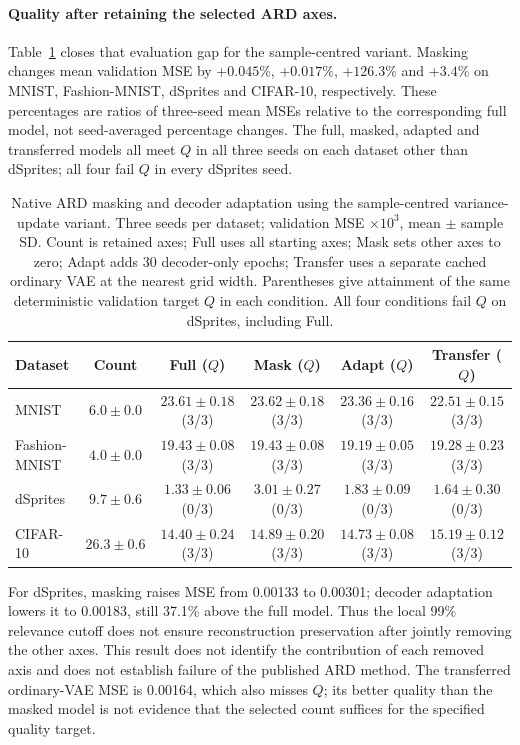 \documentclass[make,article,submit,pdftex,moreauthors]{Definitions/mdpi}
\begin{document}
\paragraph{Quality after retaining the selected ARD axes.}
Table~\ref{tab:ardpruned} closes that evaluation gap for the
sample-centred variant. Masking changes mean validation MSE by
$+0.045\%$, $+0.017\%$, $+126.3\%$ and $+3.4\%$ on MNIST,
Fashion-MNIST, dSprites and CIFAR-10, respectively. These percentages
are ratios of three-seed mean MSEs relative to the corresponding full
model, not seed-averaged percentage changes. The full, masked, adapted
and transferred models all meet $Q$ in all three seeds on each dataset
other than dSprites; all four fail $Q$ in every dSprites seed.
\begin{table}[H]
\caption{Native ARD masking and decoder adaptation using the sample-centred variance-update variant. Three seeds per dataset; validation MSE $\times10^3$, mean $\pm$ sample SD. Count is retained axes; Full uses all starting axes; Mask sets other axes to zero; Adapt adds 30 decoder-only epochs; Transfer uses a separate cached ordinary VAE at the nearest grid width. Parentheses give attainment of the same deterministic validation target $Q$ in each condition. All four conditions fail $Q$ on dSprites, including Full.}\label{tab:ardpruned}
\footnotesize
\setlength{\tabcolsep}{3pt}
\begin{tabular*}{\textwidth}{@{\extracolsep{\fill}}lccccc@{}}
\toprule
Dataset & Count & Full ($Q$) & Mask ($Q$) & Adapt ($Q$) & Transfer ($Q$) \\
\midrule
MNIST & $6.0 \pm 0.0$ & $23.61 \pm 0.18$ (3/3) & $23.62 \pm 0.18$ (3/3) & $23.36 \pm 0.16$ (3/3) & $22.51 \pm 0.15$ (3/3) \\
Fashion-MNIST & $4.0 \pm 0.0$ & $19.43 \pm 0.08$ (3/3) & $19.43 \pm 0.08$ (3/3) & $19.19 \pm 0.05$ (3/3) & $19.28 \pm 0.23$ (3/3) \\
dSprites & $9.7 \pm 0.6$ & $1.33 \pm 0.06$ (0/3) & $3.01 \pm 0.27$ (0/3) & $1.83 \pm 0.09$ (0/3) & $1.64 \pm 0.30$ (0/3) \\
CIFAR-10 & $26.3 \pm 0.6$ & $14.40 \pm 0.24$ (3/3) & $14.89 \pm 0.20$ (3/3) & $14.73 \pm 0.08$ (3/3) & $15.19 \pm 0.12$ (3/3) \\
\bottomrule\end{tabular*}
\end{table}


For dSprites, masking raises MSE from 0.00133 to 0.00301; decoder
adaptation lowers it to 0.00183, still 37.1\% above the full model.
Thus the local 99\% relevance cutoff does not ensure reconstruction
preservation after jointly removing the other axes. This result does
not identify the contribution of each removed axis and does not
establish failure of the published ARD method. The transferred
ordinary-VAE MSE is 0.00164, which also misses $Q$; its better quality
than the masked model is not evidence that the selected count suffices
for the specified quality target.
\end{document}
